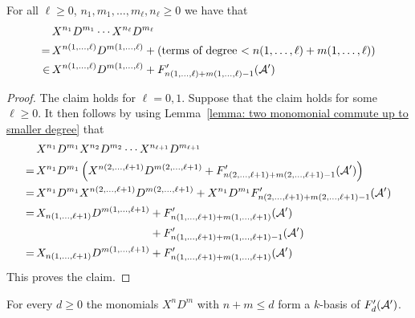 \begin{corollary}
  \label{corollary: multiple monomials commute up to smaller degree}
  For all $\ell \geq 0$, $n_1, m_1, \dotsc, m_\ell, n_\ell \geq 0$ we have that
  \begin{align*}
       &\,  X^{n_1} D^{m_1} \dotsm X^{n_\ell} D^{m_\ell}  \\
      =&\,    X^{n(1,\dotsc,\ell)} D^{m(1,\dotsc,\ell)}
            + \left(
                \text{terms of degree $< n(1,\dotsc,\ell) + m(1,\dotsc,\ell)$}
              \right) \\
    \in&\,    X^{n(1,\dotsc,\ell)} D^{m(1,\dotsc,\ell)}
            + F'_{n(1,\dotsc,\ell) + m(1,\dotsc,\ell) - 1}(\mathcal{A}')
  \end{align*}
\end{corollary}


\begin{proof}
  The claim holds for $\ell = 0, 1$.
  Suppose that the claim holds for some $\ell \geq 0$.
  It then follows by using Lemma~\ref{lemma: two monomonial commute up to smaller degree} that
    \begin{align*}
     &\,  X^{n_1} D^{m_1} X^{n_2} D^{m_2} \dotsm X^{n_{\ell+1}} D^{m_{\ell+1}}  \\
    =&\,  X^{n_1} D^{m_1}
          \left(
              X^{n(2,\dotsc,\ell+1)} D^{m(2,\dotsc,\ell+1)}
            + F'_{n(2,\dotsc,\ell+1) + m(2,\dotsc,\ell+1) - 1}(\mc{A}')
          \right) \\
    =&\,    X^{n_1} D^{m_1} X^{n(2,\dotsc,\ell+1)} D^{m(2,\dotsc,\ell+1)}
          + X^{n_1} D^{m_1} F'_{n(2,\dotsc,\ell+1) + m(2,\dotsc,\ell+1) - 1}(\mc{A}') \\
    =&\,    X_{n(1,\dotsc,\ell+1)} D^{m(1,\dotsc,\ell+1)}
          + F'_{n(1,\dotsc,\ell+1) + m(1,\dotsc,\ell+1)}(\mc{A}') \\
     &\,    \phantom{ X_{n(1,\dotsc,\ell+1)} D^{m(1,\dotsc,\ell+1)} }
          + F'_{n(1,\dotsc,\ell+1) + m(1,\dotsc,\ell+1) - 1}(\mc{A}') \\
    =&\,    X_{n(1,\dotsc,\ell+1)} D^{m(1,\dotsc,\ell+1)}
          + F'_{n(1,\dotsc,\ell+1) + m(1,\dotsc,\ell+1)}(\mc{A}')
  \end{align*}
  This proves the claim.
\end{proof}


\begin{corollary}
  \label{corollary: basis of filtration subspaces}
  For every $d \geq 0$ the monomials $X^n D^m$ with $n + m \leq d$ form a $k$-basis of $F'_d(\mathcal{A}')$.
\end{corollary}


